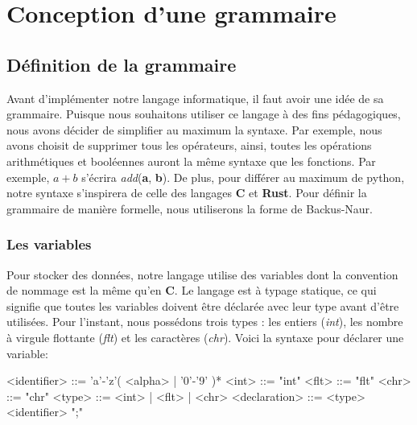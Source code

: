 \documentclass[a4paper]{article}%
\begin{document}
\clearpage{}
\setcounter{secnumdepth}{1}



\section{Conception d'une grammaire}

\subsection{Définition de la grammaire}%

Avant d'implémenter notre langage informatique, il faut avoir une idée de sa
grammaire. Puisque nous souhaitons utiliser ce langage à des fins pédagogiques,
nous avons décider de simplifier au maximum la syntaxe. Par exemple, nous avons
choisit de supprimer tous les opérateurs, ainsi, toutes les opérations
arithmétiques et booléennes auront la même syntaxe que les fonctions. Par
exemple, $a+b$ s'écrira \textit{add}(\textbf{a}, \textbf{b}). De plus, pour
différer au maximum de python, notre syntaxe s'inspirera de celle des langages
\textbf{C} et \textbf{Rust}. Pour définir la grammaire de manière formelle, nous
utiliserons la forme de Backus-Naur.

\subsubsection{Les variables}

Pour stocker des données, notre langage utilise des variables dont la
convention de nommage est la même qu'en \textbf{C}. Le langage est à typage
statique, ce qui signifie que toutes les variables doivent être déclarée avec
leur type avant d'être utilisées. Pour l'instant, nous possédons trois types :
les entiers (\textit{int}), les nombre à virgule flottante (\textit{flt}) et les
caractères (\textit{chr}). Voici la syntaxe pour déclarer une variable:

\begin{grammar}
<identifier> ::= 'a'-'z'( <alpha> | '0'-'9' )*
<int> ::= "int"
<flt> ::= "flt"
<chr> ::= "chr"
<type> ::= <int> | <flt> | <chr>
<declaration> ::= <type> <identifier> ";"
\end{grammar}\leavevmode\newline
\end{document}
